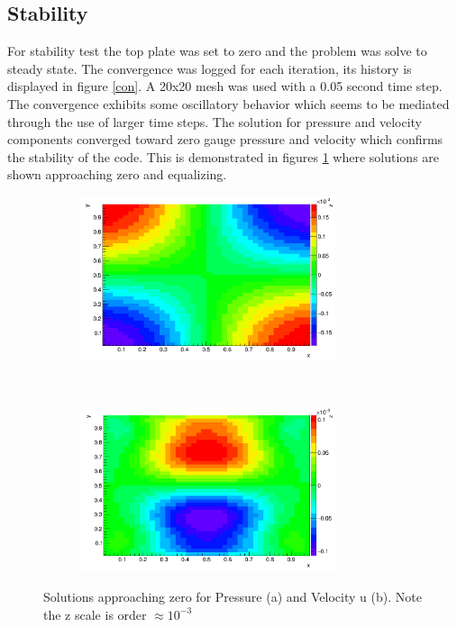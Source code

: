 \documentclass[paper=a4, fontsize=11pt, abstract=on]{scrartcl}
\numberwithin{equation}{section}		%
\numberwithin{figure}{section}			%
\numberwithin{table}{section}				%
\begin{document}
\subsection{Stability}
For stability test the top plate was set to zero and the problem was solve to steady state. The convergence was logged for each iteration, its history is displayed in figure \ref{con}. A 20x20 mesh was used with a 0.05 second time step. The convergence exhibits some oscillatory behavior which seems to be mediated through the use of larger time steps. The solution for pressure and velocity components converged toward zero gauge pressure and velocity which confirms the stability of the code. This is demonstrated in figures \ref{zero} where solutions are shown approaching zero and equalizing. 




\begin{figure}[H]
        \centering
        \begin{subfigure}[h]{0.5\textwidth}
                \includegraphics[width = 7.5cm]{z1}
                \caption{}
				
        \end{subfigure}%
       ~~~~~
        \begin{subfigure}[h]{0.5\textwidth}
                \includegraphics[width = 7.5cm]{z2}
                \caption{}
                
        \end{subfigure}
        \caption{Solutions approaching zero for Pressure (a) and Velocity u (b). Note the z scale is order $\approx 10^{-3}$ }
        \label{zero}
\end{figure}
\end{document}
